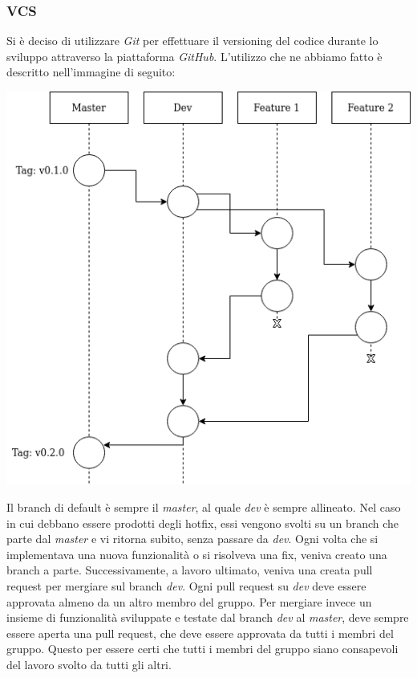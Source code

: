 \documentclass{article}
\begin{document}
    \subsubsection{VCS}
    Si è deciso di utilizzare \textit{Git} per effettuare il versioning del codice durante lo sviluppo attraverso la piattaforma \textit{GitHub}.
    L’utilizzo che ne abbiamo fatto è descritto nell'immagine di seguito:
    \begin{center}
        \includegraphics[scale=0.5]{git-workflow-1-1}
    \end{center}
    Il branch di default è sempre il \textit{master}, al quale \textit{dev} è sempre allineato.
    Nel caso in cui debbano essere prodotti degli hotfix, essi vengono svolti su un branch che parte dal \textit{master} e vi ritorna subito, senza passare da \textit{dev}.
    Ogni volta che si implementava una nuova funzionalità o si risolveva una fix, veniva creato una branch a parte.
    Successivamente, a lavoro ultimato, veniva una creata pull request per mergiare sul branch \textit{dev}.
    Ogni pull request su \textit{dev} deve essere approvata almeno da un altro membro del gruppo.
    Per mergiare invece un insieme di funzionalità sviluppate e testate dal branch \textit{dev} al \textit{master}, deve sempre essere aperta una pull request, che deve essere approvata da tutti i membri del gruppo.
    Questo per essere certi che tutti i membri del gruppo siano consapevoli del lavoro svolto da tutti gli altri.
\end{document}
